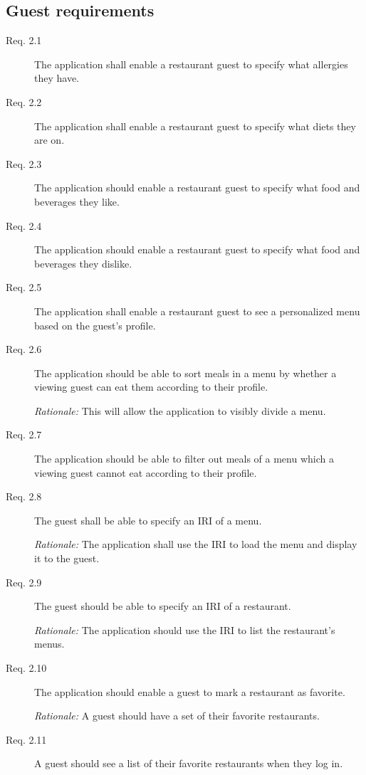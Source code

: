 \subsection{Guest requirements}
\begin{description}
    \item [Req. 2.1] The application shall enable a restaurant guest to specify what allergies they have.
    \item [Req. 2.2] The application shall enable a restaurant guest to specify what diets they are on.
    \item [Req. 2.3] The application should enable a restaurant guest to specify what food and beverages they like.
    \item [Req. 2.4] The application should enable a restaurant guest to specify what food and beverages they dislike.
    \item [Req. 2.5] The application shall enable a restaurant guest to see a personalized menu based on the guest's profile.
    \item [Req. 2.6] The application should be able to sort meals in a menu by whether a viewing guest can eat them according to their profile.

    \emph{Rationale:} This will allow the application to visibly divide a menu.
    \item [Req. 2.7] The application should be able to filter out meals of a menu which a viewing guest cannot eat according to their profile.
    \item [Req. 2.8] The guest shall be able to specify an IRI of a menu.
    
    \emph{Rationale:} The application shall use the IRI to load the menu and display it to the guest.
    \item [Req. 2.9] The guest should be able to specify an IRI of a restaurant.
    
    \emph{Rationale:} The application should use the IRI to list the restaurant's menus.
    \item [Req. 2.10] The application should enable a guest to mark a restaurant as favorite.
    
    \emph{Rationale:} A guest should have a set of their favorite restaurants.
    \item [Req. 2.11] A guest should see a list of their favorite restaurants when they log in.
\end{description}

